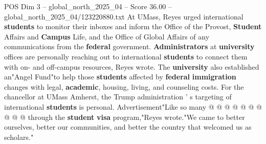 \begin{textsample}{POS Dim 3 – global\_north\_2025\_04 – Score 36.00 – global\_north\_2025\_04/123220880.txt}
At UMass, Reyes urged international \textbf{students} to monitor their inboxes and inform the Office of the Provost, \textbf{Student} Affairs and \textbf{Campus} Life, and the Office of Global Affairs of any communications from the \textbf{federal} government. \textbf{Administrators} at \textbf{university} offices are personally reaching out to international \textbf{students} to connect them with on- and off-campus resources, Reyes wrote.
The \textbf{university} also established an"Angel Fund"to help those \textbf{students} affected by \textbf{federal} \textbf{immigration} changes with legal, \textbf{academic}, housing, living, and counseling costs.
For the chancellor at UMass Amherst, the Trump administration ' s targeting of international \textbf{students} is personal.
Advertisement"Like so many @ @ @ @ @ @ @ @ @ @ through the \textbf{student} \textbf{visa} program,"Reyes wrote."We came to better ourselves, better our communities, and better the country that welcomed us as scholars."

\end{textsample}
